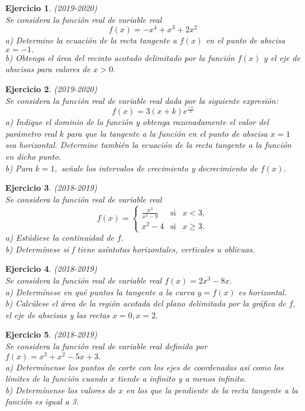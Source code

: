 \documentclass[12pt, a4paper]{amsart}
\newtheorem{ejer}{Ejercicio}
\begin{document}
\begin{ejer}\em (2019-2020)\\
Se considera la función real de variable real
\[f(x)=-x^4+x^3+2x^2\]
a) Determine la ecuación de la recta tangente a $f (x)$ en el punto de abscisa $x =-1.$\\
b) Obtenga el área del recinto acotado delimitado por la función $f(x)$ y el eje de abscisas para valores de $x > 0.$
\end{ejer}

\begin{ejer}\em (2019-2020)\\
Se considera la función real de variable real dada por la siguiente expresión:
\[f(x)=3(x+k)e^{\frac{-x}{2}}\]
a) Indique el dominio de la función y obtenga razonadamente el valor del parámetro real $k$ para que la tangente a la función en el punto de abscisa $x = 1$ sea horizontal. Determine también la ecuación de la recta tangente a
la función en dicho punto.\\
b) Para $k = 1,$ señale los intervalos de crecimiento y decrecimiento de $f (x).$
\end{ejer}

\begin{ejer}\em (2018-2019)\\
Se considera la función real de variable real
\[
f(x)=\left \{ \begin{matrix}
\frac{x^3}{x^2-9} & \text{si} & x< 3,\\
x^2-4 & \text{si} & x\geq 3.
\end{matrix}\right.
\]
a) Estúdiese la continuidad de $f.$\\
b) Determínese si f tiene asíntotas horizontales, verticales u oblicuas.
\end{ejer}

\begin{ejer}\em (2018-2019)\\
Se considera la función real de variable real $f (x) = 2x^3 - 8x.$\\
a) Determínese en qué puntos la tangente a la curva $y = f(x)$ es horizontal.\\
b) Calcúlese el área de la región acotada del plano delimitada por la gráfica de $f,$ el eje de abscisas y las rectas $x = 0, x = 2.$
\end{ejer}

\begin{ejer}\em (2018-2019)\\
Se considera la función real de variable real definida por $f(x) = x^3 + x^2 - 5x + 3.$\\
a) Determínense los puntos de corte con los ejes de coordenadas así como los límites de la función cuando $x$ tiende a infinito y a menos infinito.\\
b) Determínense los valores de $x$ en los que la pendiente de la recta tangente a la función es igual a 3.
\end{ejer}
\end{document}
